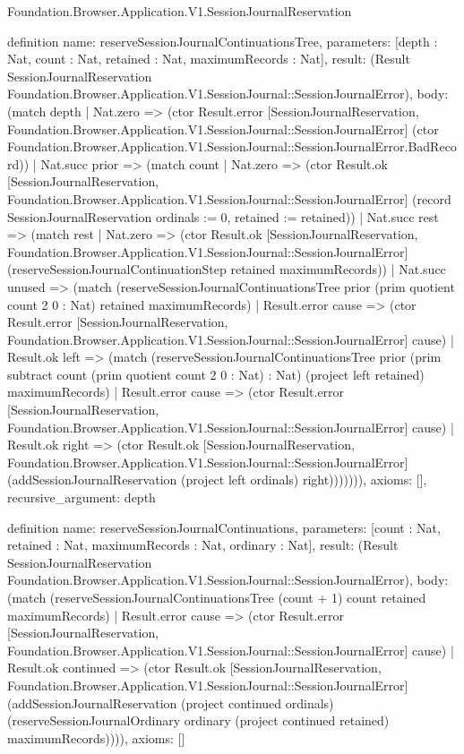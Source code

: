 \begin{lexlean}{Foundation.Browser.Application.V1.SessionJournalReservation}
\begin{semanticmodule}
definition{
  name: reserveSessionJournalContinuationsTree,
  parameters: [depth : Nat, count : Nat, retained : Nat, maximumRecords : Nat],
  result: (Result SessionJournalReservation Foundation.Browser.Application.V1.SessionJournal::SessionJournalError),
  body: (match depth
    | Nat.zero => (ctor Result.error [SessionJournalReservation, Foundation.Browser.Application.V1.SessionJournal::SessionJournalError] (ctor Foundation.Browser.Application.V1.SessionJournal::SessionJournalError.BadRecord))
    | Nat.succ prior => (match count
      | Nat.zero => (ctor Result.ok [SessionJournalReservation, Foundation.Browser.Application.V1.SessionJournal::SessionJournalError] (record SessionJournalReservation {ordinals := 0, retained := retained}))
      | Nat.succ rest => (match rest
        | Nat.zero => (ctor Result.ok [SessionJournalReservation, Foundation.Browser.Application.V1.SessionJournal::SessionJournalError] (reserveSessionJournalContinuationStep retained maximumRecords))
        | Nat.succ unused => (match (reserveSessionJournalContinuationsTree prior (prim quotient count 2 0 : Nat) retained maximumRecords)
          | Result.error cause => (ctor Result.error [SessionJournalReservation, Foundation.Browser.Application.V1.SessionJournal::SessionJournalError] cause)
          | Result.ok left => (match (reserveSessionJournalContinuationsTree prior (prim subtract count (prim quotient count 2 0 : Nat) : Nat) (project left retained) maximumRecords)
            | Result.error cause => (ctor Result.error [SessionJournalReservation, Foundation.Browser.Application.V1.SessionJournal::SessionJournalError] cause)
            | Result.ok right => (ctor Result.ok [SessionJournalReservation, Foundation.Browser.Application.V1.SessionJournal::SessionJournalError] (addSessionJournalReservation (project left ordinals) right))))))),
  axioms: [],
  recursive_argument: depth
}

definition{
  name: reserveSessionJournalContinuations,
  parameters: [count : Nat, retained : Nat, maximumRecords : Nat, ordinary : Nat],
  result: (Result SessionJournalReservation Foundation.Browser.Application.V1.SessionJournal::SessionJournalError),
  body: (match (reserveSessionJournalContinuationsTree (count + 1) count retained maximumRecords)
    | Result.error cause => (ctor Result.error [SessionJournalReservation, Foundation.Browser.Application.V1.SessionJournal::SessionJournalError] cause)
    | Result.ok continued => (ctor Result.ok [SessionJournalReservation, Foundation.Browser.Application.V1.SessionJournal::SessionJournalError] (addSessionJournalReservation (project continued ordinals) (reserveSessionJournalOrdinary ordinary (project continued retained) maximumRecords)))),
  axioms: []
}


\end{semanticmodule}
\end{lexlean}
